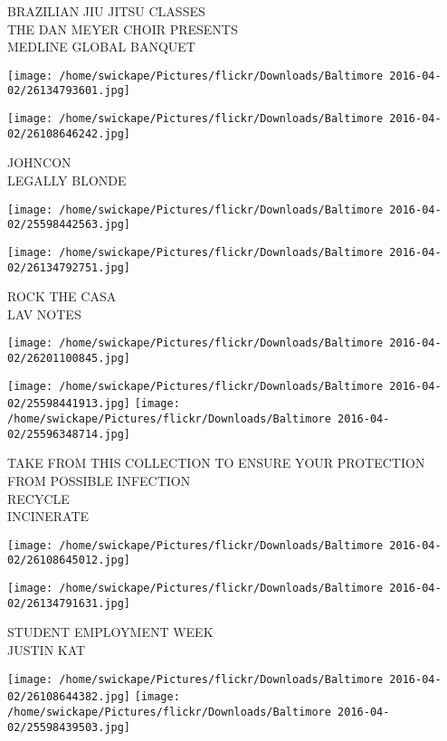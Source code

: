 \documentclass[10pt,letterpaper]{article}
\begin{document}
BRAZILIAN JIU JITSU CLASSES\\
THE DAN MEYER CHOIR PRESENTS\\
MEDLINE GLOBAL BANQUET
\pagebreak

\texttt{[image: /home/swickape/Pictures/flickr/Downloads/Baltimore 2016-04-02/26134793601.jpg]}

\vspace{0.25in}
\texttt{[image: /home/swickape/Pictures/flickr/Downloads/Baltimore 2016-04-02/26108646242.jpg]}

JOHNCON\\
LEGALLY BLONDE
\pagebreak

\texttt{[image: /home/swickape/Pictures/flickr/Downloads/Baltimore 2016-04-02/25598442563.jpg]}

\vspace{0.25in}
\texttt{[image: /home/swickape/Pictures/flickr/Downloads/Baltimore 2016-04-02/26134792751.jpg]}

ROCK THE CASA\\
LAV NOTES
\pagebreak

\texttt{[image: /home/swickape/Pictures/flickr/Downloads/Baltimore 2016-04-02/26201100845.jpg]}

\vspace{0.25in}
\texttt{[image: /home/swickape/Pictures/flickr/Downloads/Baltimore 2016-04-02/25598441913.jpg]}
\texttt{[image: /home/swickape/Pictures/flickr/Downloads/Baltimore 2016-04-02/25596348714.jpg]}

TAKE FROM THIS COLLECTION TO ENSURE YOUR PROTECTION FROM POSSIBLE INFECTION\\
RECYCLE\\
INCINERATE
\pagebreak

\texttt{[image: /home/swickape/Pictures/flickr/Downloads/Baltimore 2016-04-02/26108645012.jpg]}

\vspace{0.25in}
\texttt{[image: /home/swickape/Pictures/flickr/Downloads/Baltimore 2016-04-02/26134791631.jpg]}

STUDENT EMPLOYMENT WEEK\\
JUSTIN KAT
\pagebreak

\texttt{[image: /home/swickape/Pictures/flickr/Downloads/Baltimore 2016-04-02/26108644382.jpg]}
\texttt{[image: /home/swickape/Pictures/flickr/Downloads/Baltimore 2016-04-02/25598439503.jpg]}
\end{document}
